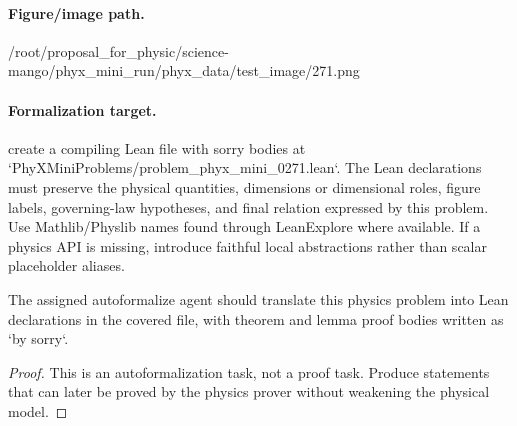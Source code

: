 \paragraph{Figure/image path.}
/root/proposal\_for\_physic/science-mango/phyx\_mini\_run/phyx\_data/test\_image/271.png

\paragraph{Formalization target.}
create a compiling Lean file with sorry bodies at `PhyXMiniProblems/problem\_phyx\_mini\_0271.lean`. The Lean declarations must preserve the physical quantities, dimensions or dimensional roles, figure labels, governing-law hypotheses, and final relation expressed by this problem.
Use Mathlib/Physlib names found through LeanExplore where available. If a physics API is missing, introduce faithful local abstractions rather than scalar placeholder aliases.

\begin{theorem}
\label{thm:physics:phyx_mini_0271:target}
The assigned autoformalize agent should translate this physics problem into Lean declarations in the covered file, with theorem and lemma proof bodies written as `by sorry`.
\end{theorem}
\begin{proof}
This is an autoformalization task, not a proof task. Produce statements that can later be proved by the physics prover without weakening the physical model.
\end{proof}

